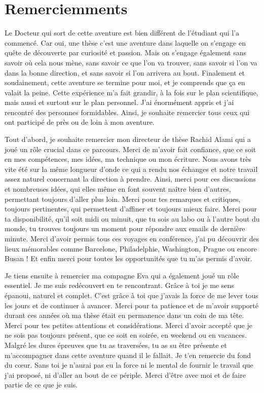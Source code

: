 \section*{Remerciemments}
 

Le Docteur qui sort de cette aventure est bien différent de l'étudiant qui l'a commencé. Car oui, une thèse c'est une aventure dans laquelle on s'engage en quête de découverte par curiosité et passion.
Mais on s'engage également sans savoir où cela nous mène, sans savoir ce que l'on va trouver, sans savoir si l'on va dans la bonne direction, et sans savoir si l'on arrivera au bout.
Finalement et soudainement, cette aventure se termine pour moi, et je comprends que ça en valait la peine. 
Cette expérience m'a fait grandir, à la fois sur le plan scientifique, mais aussi et surtout sur le plan personnel.
J'ai énormément appris et j'ai rencontré des personnes formidables.
Ainsi, je souhaite remercier tous ceux qui ont participé de près ou de loin à mon aventure.



Tout d'abord, je souhaite remercier mon directeur de thèse Rachid Alami qui a joué un rôle crucial dans ce parcours.
Merci de m'avoir fait confiance, que ce soit en mes compétences, mes idées, ma technique ou mon écriture.
Nous avons très vite été sur la même longueur d'onde ce qui a rendu nos échanges et notre travail assez naturel concernant la direction à prendre.
Ainsi, merci pour ces discussions et nombreuses idées, qui elles même en font souvent naître bien d'autres, permettant toujours d'aller plus loin. 
Merci pour tes remarques et critiques, toujours pertinentes, qui permettent d'affiner et toujours mieux faire.
Merci pour ta disponibilité, qu'il soit midi ou minuit, que tu sois au labo ou à l'autre bout du monde, tu trouves toujours un moment pour répondre aux emails de dernière minute.
Merci d'avoir permis tous ces voyages en conférence, j'ai pu découvrir des lieux mémorables comme Barcelone, Philadelphie, Washington, Prague ou encore Busan ! 
Et enfin merci pour toutes les opportunités que tu m'as permis d'avoir.



Je tiens ensuite à remercier ma compagne Eva qui a également joué un rôle essentiel. 
Je me suis redécouvert en te rencontrant. Grâce à toi je me sens épanoui, naturel et complet. C'est grâce à toi que j'avais la force de me lever tous les jours et de continuer à avancer. 
Merci pour ta patience et de m'avoir supporté durant ces années où ma thèse était en permanence dans un coin de ma tête.  
Merci pour tes petites attentions et considérations. 
Merci d'avoir accepté que je ne sois pas toujours présent, que ce soit en soirée, en weekend ou en vacances. 
Malgré les dures épreuves que tu as traversées, tu as su être présente et m'accompagner dans cette aventure quand il le fallait.
Je t'en remercie du fond du cœur.
Sans toi je n'aurai pas eu la force ni le mental de fournir le travail que j'ai proposé, ni d'aller au bout de ce périple. 
Merci d'être avec moi et de faire partie de ce que je suis. 


